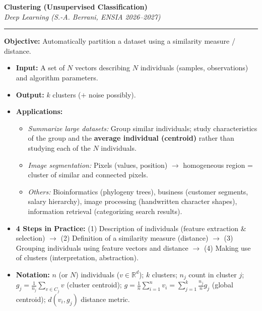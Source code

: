 \documentclass[10pt,a4paper]{article}
\begin{document}

\begin{center}
    {\LARGE\bfseries\color{themeblue} Clustering (Unsupervised Classification)}\\[2pt]
    {\small\itshape Deep Learning (S.-A. Berrani, ENSIA 2026--2027)}\\[2pt]
    \textcolor{themeblue}{\rule{\textwidth}{0.6pt}}
\end{center}

\vspace{-7pt}

\begin{tcolorbox}[
    colframe=themeblue,
    colback=lightbg,
    coltitle=white,
    fonttitle=\bfseries\sffamily,
    title={Objective, Applications \& Notation},
    arc=1.5mm,
    boxrule=0.6pt,
    left=6pt, right=6pt, top=3pt, bottom=3pt
]
\textbf{Objective:} Automatically partition a dataset using a similarity measure / distance.
\begin{itemize}[leftmargin=10pt, itemsep=1pt, topsep=1pt]
    \item \textbf{Input:} A set of $N$ vectors describing $N$ individuals (samples, observations) and algorithm parameters.
    \item \textbf{Output:} $k$ clusters ($+$ noise possibly).
    \item \textbf{Applications:}
    \begin{itemize}[leftmargin=8pt, itemsep=0.5pt]
        \item \textit{Summarize large datasets:} Group similar individuals; study characteristics of the group and the \textbf{average individual (centroid)} rather than studying each of the $N$ individuals.
        \item \textit{Image segmentation:} Pixels (values, position) $\to$ homogeneous region = cluster of similar and connected pixels.
        \item \textit{Others:} Bioinformatics (phylogeny trees), business (customer segments, salary hierarchy), image processing (handwritten character shapes), information retrieval (categorizing search results).
    \end{itemize}
    \item \textbf{4 Steps in Practice:} (1) Description of individuals (feature extraction \& selection) $\to$ (2) Definition of a similarity measure (distance) $\to$ (3) Grouping individuals using feature vectors and distance $\to$ (4) Making use of clusters (interpretation, abstraction).
    \item \textbf{Notation:} $n$ (or $N$) individuals ($v \in \mathbb{R}^d$); $k$ clusters; $n_j$ count in cluster $j$; $g_j = \frac{1}{n_j}\sum_{v \in C_j} v$ (cluster centroid); $g = \frac{1}{n}\sum_{i=1}^n v_i = \sum_{j=1}^k \frac{n_j}{n} g_j$ (global centroid); $d(v_i, g_j)$ distance metric.
\end{itemize}
\end{tcolorbox}
\end{document}
